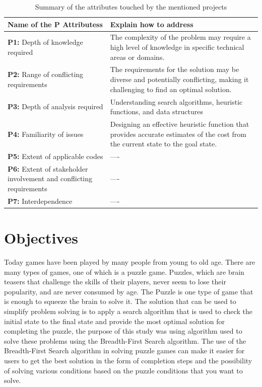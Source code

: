 \documentclass[12pt]{report}
\begin{document}
\begin{table}[htbp]
   \centering
    \caption{Summary of the attributes touched by the mentioned projects}
    \begin{tabular}{|p{6.0 cm}|p{8 cm}|}
    \toprule
        \textbf{Name of the P Attributess} & \textbf{Explain how to address}  \\
        \midrule

    \textbf{P1:} Depth of knowledge required  &  The complexity of the problem may require a high level of knowledge in specific technical areas or domains. \\
      \hline
       
    \textbf{P2:} Range of conflicting
     requirements  &  The requirements for the solution may be diverse and potentially conflicting, making it challenging to find an optimal solution. \\
      \hline

    \textbf{P3:} Depth of analysis required  &  Understanding search algorithms, heuristic functions, and data structures \\
    \hline
    
    \textbf{P4:} Familiarity of issues  & Designing an effective heuristic function that provides accurate estimates of the cost from the current state to the goal state. \\ 
    \hline
    \textbf{P5:} Extent of applicable codes  &  ---- \\
      \hline
       
    \textbf{P6:} Extent of stakeholder
     involvement and conflicting
     requirements  &  ---- \\
      \hline

    \textbf{P7:} Interdependence  &  ---- \\
    \hline
        
    \end{tabular}
    \label{tab:IC}
\end{table}

\section{Objectives}
Today games have been played by many people from young to old age. There are many types of games, one of which is a puzzle game. Puzzles, which are brain teasers that challenge the skills of their players, never seem to lose their popularity, and are never consumed by age. The Puzzle is one type of game that is enough to squeeze the brain to solve it. The solution that can be used to simplify problem solving is to apply a search algorithm that is used to check the initial state to the final state and provide the most optimal solution for completing the puzzle, the purpose of this study was using algorithm used to solve these problems using the Breadth-First Search algorithm. The use of the Breadth-First Search algorithm in solving puzzle games can make it easier for users to get the best solution in the form of completion steps and the possibility of solving various conditions based on the puzzle conditions that you want to solve.
\end{document}
